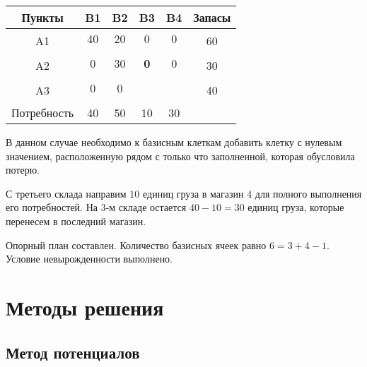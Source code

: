 \documentclass[a4paper,12pt]{article}
\begin{document}
	\begin{center}
		\begin{tabular}{|c|c|c|c|c|c|c|c|c|c}
			\hline
			Пункты & \multicolumn{2}{c|}{B1} & \multicolumn{2}{c|}{B2} & \multicolumn{2}{c|}{B3} & \multicolumn{2}{c|}{B4} & \multicolumn{1}{c|}{Запасы} \\ \hline
			\multirow{2}{*}{A1} & \multicolumn{2}{c|}{40} & \multicolumn{2}{c|}{20} & \multicolumn{2}{c|}{0} & \multicolumn{2}{c|}{0} & \multicolumn{1}{c|}{\multirow{2}{*}{60}} \\ \cline{2-9}
			&  &  &  &  &  &  &  &  & \multicolumn{1}{c|}{} \\ \hline
			\multirow{2}{*}{A2} & \multicolumn{2}{c|}{0} & \multicolumn{2}{c|}{30} & \multicolumn{2}{c|}{\textbf{0}} & \multicolumn{2}{c|}{0} & \multicolumn{1}{c|}{\multirow{2}{*}{30}} \\ \cline{2-9}
			&  &  &  &  &  &  &  &  & \multicolumn{1}{c|}{} \\ \hline
			\multirow{2}{*}{A3} & \multicolumn{2}{c|}{0} & \multicolumn{2}{c|}{0} & \multicolumn{2}{c|}{} & \multicolumn{2}{c|}{} & \multicolumn{1}{c|}{\multirow{2}{*}{40}} \\ \cline{2-9}
			&  &  &  &  &  &  &  &  & \multicolumn{1}{c|}{} \\ \hline
			Потребность & \multicolumn{2}{c|}{40} & \multicolumn{2}{c|}{50} & \multicolumn{2}{c|}{10} & \multicolumn{2}{c|}{30} &  \\ \cline{1-9}
		\end{tabular}
	\end{center}

	В данном случае необходимо к базисным клеткам добавить клетку с нулевым значением, расположенную рядом с только что заполненной, которая обусловила потерю.
	
	С третьего склада направим $10$ единиц груза в магазин $4$ для полного выполнения его потребностей. На $3$-м складе  остается $40 - 10 = 30$ единиц груза, которые перенесем в последний магазин.

	Опорный план составлен. Количество базисных ячеек равно $6 = 3 + 4 - 1$.  Условие невырожденности выполнено.
	
	
	\clearpage
	
\section{Методы решения}
	\subsection{Метод потенциалов}
	
\end{document}
